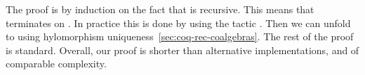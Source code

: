 \documentclass[a4paper,UKenglish,cleveref, autoref, thm-restate]{lipics-v2021}
\begin{document}
The proof is by induction on the fact that  is recursive. This means
that  terminates on .  In practice this is done by using the
tactic . Then we can unfold  to
 using hylomorphism
uniqueness~\ref{sec:coq-rec-coalgebras}. The rest of the proof is standard.
Overall, our proof is shorter than alternative implementations, and of
comparable complexity.



\end{document}
